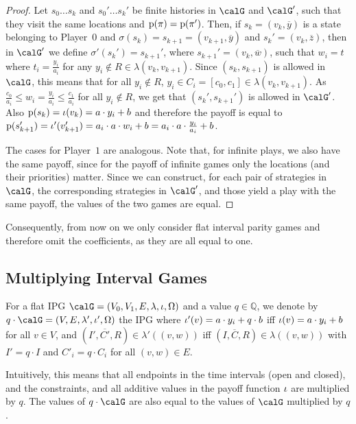 \documentclass[fleqn,envcountsame]{LMCS}
\newcommand{\pzero}{Player~$0$\xspace}
\newcommand{\pone}{Player~$1$\xspace}
\newcommand{\setQ}{\ensuremath{\mathbb{Q}}}
\newcommand{\ol}[1]{\ensuremath{\overline{#1}}}
\newcommand{\labels}{\ensuremath{\lambda}}
\begin{document}
\begin{proof}
Let $s_0 \ldots s_k$ and $s_0' \ldots s_k'$ be finite histories in $\calG$ and
$\calG'$, such that they visit the same locations and $\mathrm{p}(\pi)=\mathrm{p}(\pi')$.
Then, if $s_k=(v_k, \ol y)$ is a state belonging to \pzero and
$\sigma(s_k)=s_{k+1}=(v_{k+1}, \ol y)$ and $s_k'=(v_k, \ol z)$,
then in $\calG'$ we define $\sigma'(s_k')=s_{k+1}'$, where
$s_{k+1}'=(v_k,\ol w)$, such that $w_i=t$ where $t_i= \frac {y_i} {a_i}$
for any $y_i \nin R \in \labels(v_k,v_{k+1})$.
Since $(s_k,s_{k+1})$ is allowed in $\calG$, this means that for
all $y_i \nin R$, $y_i \in C_i=[c_0,c_1] \in \labels(v_k,v_{k+1})$.
As $\frac {c_0} {a_i} \leq w_i= \frac {y_i} {a_i} \leq \frac {c_1} {a_i}$ for
all $y_i \nin R$, we get that $(s_k',s_{k+1}')$ is allowed in $\calG'$.
Also $\mathrm{p}(s_k)=\iota(v_k)=a \cdot y_i + b$ and therefore the payoff is equal
to $\mathrm{p}(s_{k+1}')=\iota'(v_{k+1}')=a_i \cdot a \cdot w_i + b =
    a_i \cdot a \cdot \frac {y_i} {a_i} + b$.

The cases for \pone are analogous. Note that, for infinite plays,
we also have the same payoff, since for the payoff of infinite games only
the locations (and their priorities) matter. Since we can construct, for
each pair of strategies in $\calG$, the corresponding strategies in $\calG'$,
and those yield a play with the same payoff, the values of the two games
are equal.
\end{proof}

Consequently, from now on we only consider flat interval parity games and
therefore omit the coefficients, as they are all equal to one.


\subsection{Multiplying Interval Games}\label{subsec_mult}

\begin{defi}
For a flat IPG $\calG = (V_0, V_1, E, \labels, \indexi, \Omega)$ and
a value $q \in \setQ$, we denote by
$q \cdot \calG = (V, E, \labels', \indexi', \Omega)$ the IPG where 
$\iota'(v) = a \cdot y_i + q \cdot b$ iff $\iota(v) = a \cdot y_i + b$ 
for all $v \in V$, and  $(I', \ol{C'}, R) \in \lambda'((v,w))$ iff
$(I, \ol{C}, R) \in \lambda((v,w))$ with $I'= q \cdot I$ and
${C'}_i= q \cdot C_i$ for all $(v,w) \in E$.
\end{defi}

Intuitively, this means that all endpoints in the time intervals (open and closed),
and the constraints, and all additive values in the payoff function $\iota$
are multiplied by $q$. The values of $q \cdot \calG$ are also equal to
the values of $\calG$ multiplied by $q$.
\end{document}
